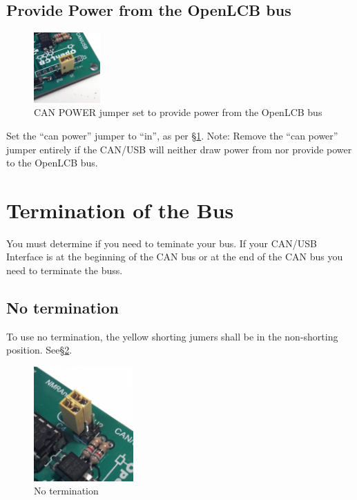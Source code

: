 \documentclass[15pt]{book}
\begin{document}
\subsection{Provide Power from the OpenLCB bus}
\begin{figure}[htbp]
\begin{center}
\includegraphics[width=1in]{images/power_in.png}
\caption{CAN POWER jumper set to provide power from the OpenLCB bus}
\label{CANIN}
\end{center}
\end{figure}
Set the ``can power'' jumper to ``in'', as per \S \ref{CANIN}.  Note: Remove the ``can power'' jumper entirely if the CAN/USB will neither draw power from nor provide power to the OpenLCB bus.
\section{Termination of the Bus}
You must determine if you need to teminate your bus.  If your CAN/USB Interface is at the beginning of the CAN bus or at the end of the CAN bus you need to terminate the buss.
\subsection{No termination}
\label{NoTerm}
To use no termination, the yellow shorting jumers shall be in the non-shorting position. See\S\ref{NoTerm}.
\begin{figure}[htbp]
\begin{center}
\includegraphics[width=1.5in]{images/term_none.png}
\caption{No termination}
\label{NoTerm}
\end{center}
\end{figure}
\end{document}
